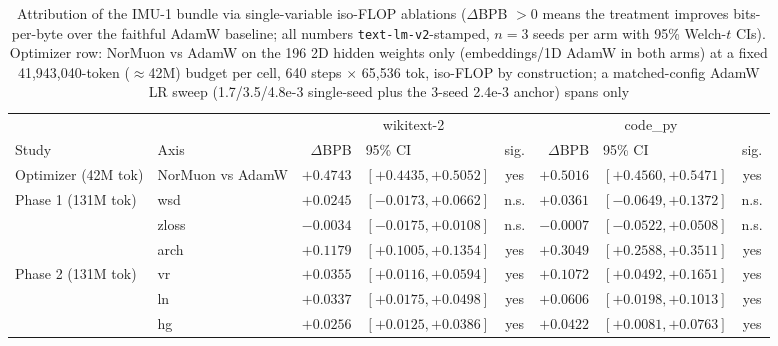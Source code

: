 \begin{table}[t]
\centering
\small
\setlength{\tabcolsep}{3pt}
\begin{tabular}{@{}llrlcrlc@{}}
\toprule
 & & \multicolumn{3}{c}{wikitext-2} & \multicolumn{3}{c}{code\_py} \\
\cmidrule(lr){3-5} \cmidrule(l){6-8}
Study & Axis & $\Delta$BPB & 95\% CI & sig. & $\Delta$BPB & 95\% CI & sig. \\
\midrule
Optimizer (42M tok) & NorMuon vs AdamW & $+0.4743$ & $[+0.4435, +0.5052]$ & yes & $+0.5016$ & $[+0.4560, +0.5471]$ & yes \\
\midrule
Phase 1 (131M tok)  & wsd   & $+0.0245$ & $[-0.0173, +0.0662]$ & n.s. & $+0.0361$ & $[-0.0649, +0.1372]$ & n.s. \\
                    & zloss & $-0.0034$ & $[-0.0175, +0.0108]$ & n.s. & $-0.0007$ & $[-0.0522, +0.0508]$ & n.s. \\
                    & arch  & $+0.1179$ & $[+0.1005, +0.1354]$ & yes  & $+0.3049$ & $[+0.2588, +0.3511]$ & yes \\
\midrule
Phase 2 (131M tok)  & vr    & $+0.0355$ & $[+0.0116, +0.0594]$ & yes  & $+0.1072$ & $[+0.0492, +0.1651]$ & yes \\
                    & ln    & $+0.0337$ & $[+0.0175, +0.0498]$ & yes  & $+0.0606$ & $[+0.0198, +0.1013]$ & yes \\
                    & hg    & $+0.0256$ & $[+0.0125, +0.0386]$ & yes  & $+0.0422$ & $[+0.0081, +0.0763]$ & yes \\
\bottomrule
\end{tabular}
\caption{Attribution of the IMU-1 bundle via single-variable iso-FLOP
ablations ($\Delta$BPB $>0$ means the treatment improves bits-per-byte over
the faithful AdamW baseline; all numbers \texttt{text-lm-v2}-stamped,
$n{=}3$ seeds per arm with 95\% Welch-$t$ CIs). Optimizer row: NorMuon vs
AdamW on the 196 2D hidden weights only (embeddings/1D AdamW in both arms)
at a fixed 41{,}943{,}040-token ($\approx$42M) budget per cell, 640 steps
$\times$ 65{,}536 tok, iso-FLOP by construction; a matched-config AdamW LR
sweep (1.7/3.5/4.8e-3 single-seed plus the 3-seed 2.4e-3 anchor) spans only
}
\end{table}
